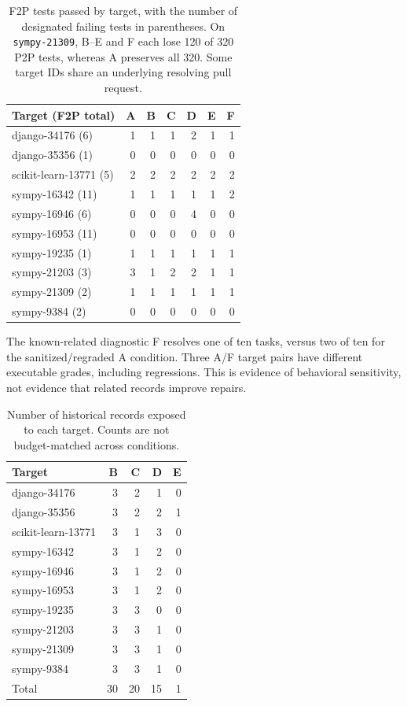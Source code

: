 \documentclass[sigconf,anonymous]{aamas}
\begin{document}
\begin{table}[t]
\caption{F2P tests passed by target, with the number of designated failing tests in parentheses. On \texttt{sympy-21309}, B--E and F each lose 120 of 320 P2P tests, whereas A preserves all 320. Some target IDs share an underlying resolving pull request.}
\label{tab:targets}
\centering
\scriptsize
\setlength{\tabcolsep}{2pt}
\begin{tabular}{lrrrrrr}
\toprule
Target (F2P total) & A & B & C & D & E & F\\
\midrule
django-34176 (6) & 1 & 1 & 1 & 2 & 1 & 1\\
django-35356 (1) & 0 & 0 & 0 & 0 & 0 & 0\\
scikit-learn-13771 (5) & 2 & 2 & 2 & 2 & 2 & 2\\
sympy-16342 (11) & 1 & 1 & 1 & 1 & 1 & 2\\
sympy-16946 (6) & 0 & 0 & 0 & 4 & 0 & 0\\
sympy-16953 (11) & 0 & 0 & 0 & 0 & 0 & 0\\
sympy-19235 (1) & 1 & 1 & 1 & 1 & 1 & 1\\
sympy-21203 (3) & 3 & 1 & 2 & 2 & 1 & 1\\
sympy-21309 (2) & 1 & 1 & 1 & 1 & 1 & 1\\
sympy-9384 (2) & 0 & 0 & 0 & 0 & 0 & 0\\
\bottomrule
\end{tabular}
\end{table}

The known-related diagnostic F resolves one of ten tasks, versus two of ten for the sanitized/regraded A condition. Three A/F target pairs have different executable grades, including regressions. This is evidence of behavioral sensitivity, not evidence that related records improve repairs.

\begin{table}[t]
\caption{Number of historical records exposed to each target. Counts are not budget-matched across conditions.}
\label{tab:exposure}
\centering
\small
\begin{tabular}{lrrrr}
\toprule
Target & B & C & D & E\\
\midrule
django-34176 & 3 & 2 & 1 & 0\\
django-35356 & 3 & 2 & 2 & 1\\
scikit-learn-13771 & 3 & 1 & 3 & 0\\
sympy-16342 & 3 & 1 & 2 & 0\\
sympy-16946 & 3 & 1 & 2 & 0\\
sympy-16953 & 3 & 1 & 2 & 0\\
sympy-19235 & 3 & 3 & 0 & 0\\
sympy-21203 & 3 & 3 & 1 & 0\\
sympy-21309 & 3 & 3 & 1 & 0\\
sympy-9384 & 3 & 3 & 1 & 0\\
\midrule
Total & 30 & 20 & 15 & 1\\
\bottomrule
\end{tabular}
\end{table}
\end{document}
